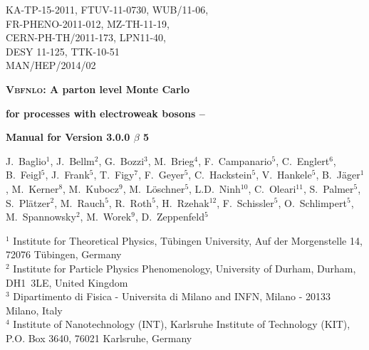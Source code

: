 \documentclass[english,12pt]{article}
\begin{document}
\begin{titlepage}
{\begin{flushright}{
 \begin{minipage}{8.5cm}
  KA-TP-15-2011,  FTUV-11-0730,  WUB/11-06, \\ 
  FR-PHENO-2011-012,  MZ-TH-11-19, \\ 
  CERN-PH-TH/2011-173,  LPN11-40, \\ 
  DESY 11-125,  TTK-10-51 \\
  MAN/HEP/2014/02
\end{minipage}}\end{flushright}}
\vspace{1cm}
\begin{center} {\Large \bf \textsc{Vbfnlo}: A parton level Monte Carlo
    } 
\end{center}
\begin{center}
 {\Large \bf  for processes with electroweak bosons --}
\end{center}
\begin{center}
 {\Large \bf  Manual for Version 3.0.0 $\beta$ 5}
\end{center}
\vspace{0.6cm}
\begin{center}
{\renewcommand{\baselinestretch}{4}
J.~Baglio$^{1}$, J.~Bellm$^{2}$, G.~Bozzi$^{3}$,
M.~Brieg$^{4}$, F.~Campanario$^{5}$, C.~Englert$^{6}$, B.~Feigl$^{5}$,
J.~Frank$^{5}$, T.~Figy$^{7}$, F.~Geyer$^{5}$, C.~Hackstein$^{5}$,
V.~Hankele$^{5}$, B.~J\"ager$^{1}$, M.~Kerner$^{8}$,
M.~Kubocz$^{9}$, M.~L\"oschner$^{5}$,
L.D.~Ninh$^{10}$, C.~Oleari$^{11}$, S.~Palmer$^{5}$,
S.~Pl\"atzer$^{2}$, M.~Rauch$^{5}$, R.~Roth$^{5}$, H.~Rzehak$^{12}$,
F.~Schissler$^{5}$, O.~Schlimpert$^{5}$, M.~Spannowsky$^{2}$,
M.~Worek$^{9}$, D.~Zeppenfeld$^{5}$
}
\end{center}
\vspace{0.4cm}
\begin{center}
$^{1}$ Institute for Theoretical Physics, T\"{u}bingen University, Auf der Morgenstelle 14, 72076 T\"{u}bingen, Germany \\ \noindent
$^{2}$ Institute for Particle Physics Phenomenology, University of Durham, Durham, DH1~3LE, United Kingdom \\ \noindent
$^{3}$ Dipartimento di Fisica - Universita di Milano and INFN, Milano - 20133 Milano, Italy\\ \noindent
$^{4}$ Institute of Nanotechnology (INT), Karlsruhe Institute of Technology (KIT), P.O. Box 3640, 76021 Karlsruhe, Germany \\ \noindent

\end{center}
\end{titlepage}
\end{document}
